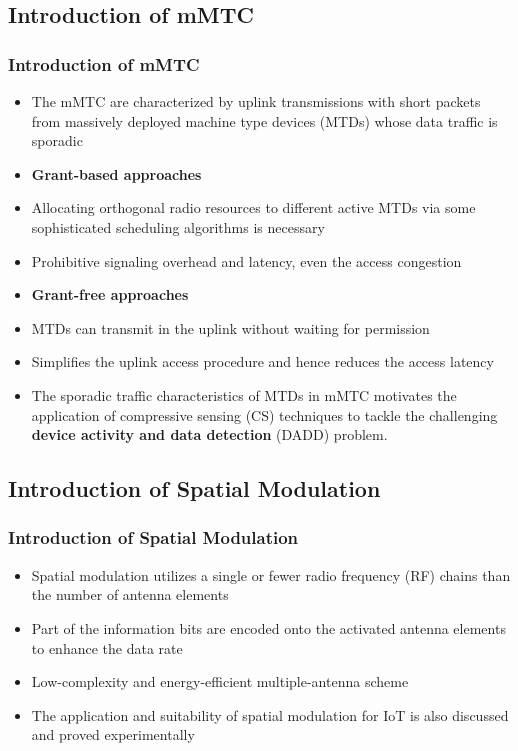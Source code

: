 \documentclass[9pt]{beamer}
\begin{document}
\subsection{Introduction of mMTC}
\begin{frame}
\frametitle{Introduction of mMTC}
\begin{itemize}
\item
The mMTC are characterized by uplink transmissions with short packets from massively deployed machine type devices (MTDs) whose data traffic is sporadic
\item
{\bf Grant-based approaches}
\item
Allocating orthogonal radio resources to different active MTDs via some sophisticated scheduling algorithms is necessary
\item
Prohibitive signaling overhead and latency, even the access congestion
\item
{\bf Grant-free approaches}
\item
MTDs can transmit in the uplink without waiting for permission
\item
Simplifies the uplink access procedure and hence reduces the access latency
\item 
The sporadic traffic characteristics of MTDs in mMTC motivates the application of compressive sensing (CS) techniques to tackle the challenging {\bf device activity and data detection} (DADD) problem.

\end{itemize}
\end{frame}

\subsection{Introduction of Spatial Modulation}
\begin{frame}
\frametitle{Introduction of Spatial Modulation}
\begin{itemize}
\item
Spatial modulation utilizes a single or fewer radio frequency (RF) chains than the number of antenna elements
\item
Part of the information bits are encoded onto the activated antenna elements to enhance the data rate
\item
Low-complexity and energy-efficient multiple-antenna scheme
\item
The application and suitability of spatial modulation for IoT is also discussed and proved experimentally
\end{itemize}
\end{frame}
\end{document}
